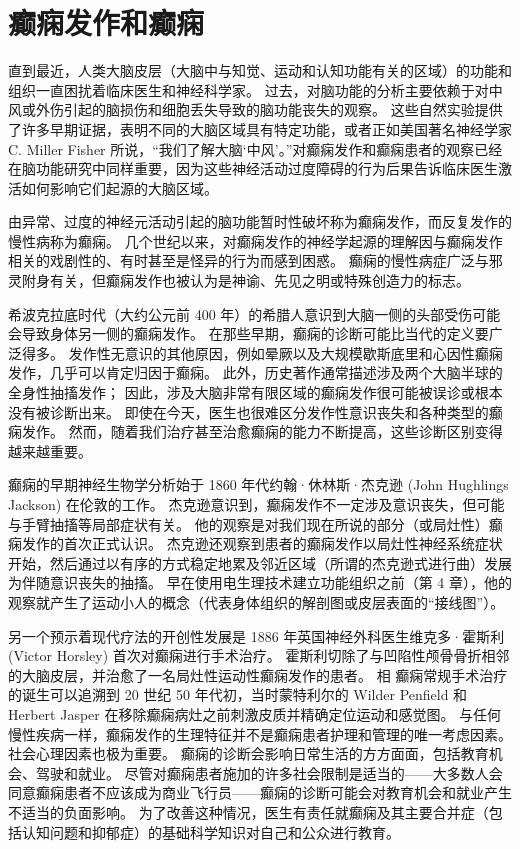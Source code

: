 \chapter{癫痫发作和癫痫} \label{chap:chap58}
直到最近，人类大脑皮层（大脑中与知觉、运动和认知功能有关的区域）的功能和组织一直困扰着临床医生和神经科学家。 过去，对脑功能的分析主要依赖于对中风或外伤引起的脑损伤和细胞丢失导致的脑功能丧失的观察。 这些自然实验提供了许多早期证据，表明不同的大脑区域具有特定功能，或者正如美国著名神经学家 C. Miller Fisher 所说，“我们了解大脑‘中风’。”对癫痫发作和癫痫患者的观察已经 在脑功能研究中同样重要，因为这些神经活动过度障碍的行为后果告诉临床医生激活如何影响它们起源的大脑区域。

由异常、过度的神经元活动引起的脑功能暂时性破坏称为癫痫发作，而反复发作的慢性病称为癫痫。 几个世纪以来，对癫痫发作的神经学起源的理解因与癫痫发作相关的戏剧性的、有时甚至是怪异的行为而感到困惑。 癫痫的慢性病症广泛与邪灵附身有关，但癫痫发作也被认为是神谕、先见之明或特殊创造力的标志。

希波克拉底时代（大约公元前 400 年）的希腊人意识到大脑一侧的头部受伤可能会导致身体另一侧的癫痫发作。 在那些早期，癫痫的诊断可能比当代的定义要广泛得多。 发作性无意识的其他原因，例如晕厥以及大规模歇斯底里和心因性癫痫发作，几乎可以肯定归因于癫痫。 此外，历史著作通常描述涉及两个大脑半球的全身性抽搐发作； 因此，涉及大脑非常有限区域的癫痫发作很可能被误诊或根本没有被诊断出来。 即使在今天，医生也很难区分发作性意识丧失和各种类型的癫痫发作。 然而，随着我们治疗甚至治愈癫痫的能力不断提高，这些诊断区别变得越来越重要。

癫痫的早期神经生物学分析始于 1860 年代约翰·休林斯·杰克逊 (John Hughlings Jackson) 在伦敦的工作。 杰克逊意识到，癫痫发作不一定涉及意识丧失，但可能与手臂抽搐等局部症状有关。 他的观察是对我们现在所说的部分（或局灶性）癫痫发作的首次正式认识。 杰克逊还观察到患者的癫痫发作以局灶性神经系统症状开始，然后通过以有序的方式稳定地累及邻近区域（所谓的杰克逊式进行曲）发展为伴随意识丧失的抽搐。 早在使用电生理技术建立功能组织之前（第 4 章），他的观察就产生了运动小人的概念（代表身体组织的解剖图或皮层表面的“接线图”）。

另一个预示着现代疗法的开创性发展是 1886 年英国神经外科医生维克多·霍斯利 (Victor Horsley) 首次对癫痫进行手术治疗。 霍斯利切除了与凹陷性颅骨骨折相邻的大脑皮层，并治愈了一名局灶性运动性癫痫发作的患者。 相 癫痫常规手术治疗的诞生可以追溯到 20 世纪 50 年代初，当时蒙特利尔的 Wilder Penfield 和 Herbert Jasper 在移除癫痫病灶之前刺激皮质并精确定位运动和感觉图。 与任何慢性疾病一样，癫痫发作的生理特征并不是癫痫患者护理和管理的唯一考虑因素。 社会心理因素也极为重要。 癫痫的诊断会影响日常生活的方方面面，包括教育机会、驾驶和就业。 尽管对癫痫患者施加的许多社会限制是适当的——大多数人会同意癫痫患者不应该成为商业飞行员——癫痫的诊断可能会对教育机会和就业产生不适当的负面影响。 为了改善这种情况，医生有责任就癫痫及其主要合并症（包括认知问题和抑郁症）的基础科学知识对自己和公众进行教育。

